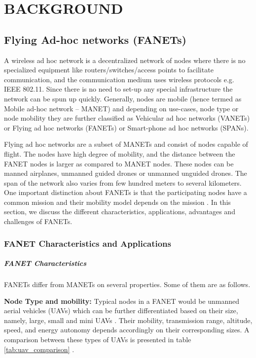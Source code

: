 \chapter{BACKGROUND}
\label{chap-two}

\section{Flying Ad-hoc networks (FANETs)}

A wireless ad hoc network is a decentralized network of nodes where there is no specialized equipment like routers/switches/access points to facilitate communication, and the communication medium uses wireless protocols e.g. IEEE 802.11. Since there is no need to set-up any special infrastructure the network can be spun up quickly. Generally, nodes are mobile (hence termed as Mobile ad-hoc network – MANET) and depending on use-cases, node type or node mobility they are further classified as Vehicular ad hoc networks (VANETs) or Flying ad hoc networks (FANETs) or Smart-phone ad hoc networks (SPANs).

Flying ad hoc networks are a subset of MANETs and consist of nodes capable of flight. The nodes have high degree of mobility, and the distance between the FANET nodes is larger as compared to MANET nodes. These nodes can be manned airplanes, unmanned guided drones or unmanned unguided drones. The span of the network also varies from few hundred meters to several kilometers. One important distinction about FANETs is that the participating nodes have a common mission and their mobility model depends on the mission \cite{OUBBATI201729}. In this section, we discuss the different characteristics, applications, advantages and challenges of FANETs.

\subsection{FANET Characteristics and Applications}
\paragraph{FANET Characteristics}
FANETs differ from MANETs on several properties. Some of them are as follows.

\textbf{Node Type and mobility:} Typical nodes in a FANET would be unmanned aerial vehicles (UAVs) which can be further differentiated based on their size, namely, large, small and mini UAVs \cite{OUBBATI201729}. Their mobility, transmission range, altitude, speed, and energy autonomy depends accordingly on their corresponding sizes. A comparison between these types of UAVs is presented in table \ref{tab:uav_comparison} \cite{OUBBATI201729}.

